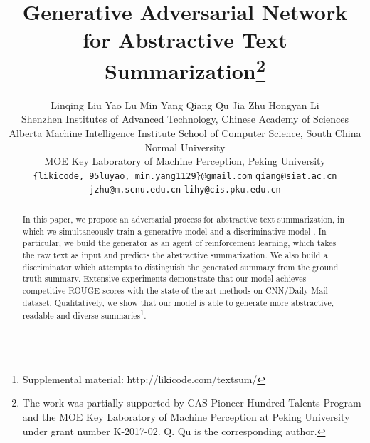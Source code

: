\documentclass[letterpaper]{article} \usepackage{aaai18}  \usepackage{times}  \usepackage{helvet}  \usepackage{courier}  \usepackage{url}  \usepackage{graphicx}  \frenchspacing  \usepackage{multirow}
\begin{document}
\title{Generative Adversarial Network for Abstractive Text Summarization\thanks{The work was partially supported by CAS Pioneer Hundred Talents Program and the MOE Key Laboratory of Machine Perception at Peking University under grant number K-2017-02. Q. Qu is the corresponding author.}}
\author{Linqing Liu \hspace{0.3cm}  Yao Lu \hspace{0.3cm} Min Yang \hspace{0.3cm} Qiang Qu \hspace{0.3cm} Jia Zhu \hspace{0.3cm} Hongyan Li\\
	Shenzhen Institutes of Advanced Technology, Chinese Academy of Sciences\\ 
	Alberta Machine Intelligence Institute \space
	School of Computer Science, South China Normal University\\ 
    MOE Key Laboratory of Machine Perception, Peking University\\ 
{\tt \{likicode, 95luyao, min.yang1129\}@gmail.com} \hspace{0.3cm} {\tt qiang@siat.ac.cn} \\{\tt jzhu@m.scnu.edu.cn} \hspace{0.3cm} {\tt lihy@cis.pku.edu.cn}
}


\maketitle
\begin{abstract}
In this paper, we propose an adversarial process for abstractive text summarization, in which we simultaneously train a generative model  and  a discriminative model .  In particular,  we build the generator  as an agent of reinforcement learning, which takes the raw text as input and predicts the abstractive summarization.  We also build a discriminator which attempts to distinguish the generated summary from the ground truth summary.  Extensive experiments demonstrate that our model achieves competitive ROUGE scores with the state-of-the-art methods on CNN/Daily Mail dataset.  Qualitatively, we show that our model is able to generate more abstractive, readable and diverse summaries\footnote{Supplemental material: http://likicode.com/textsum/}. 
\end{abstract}
\end{document}
